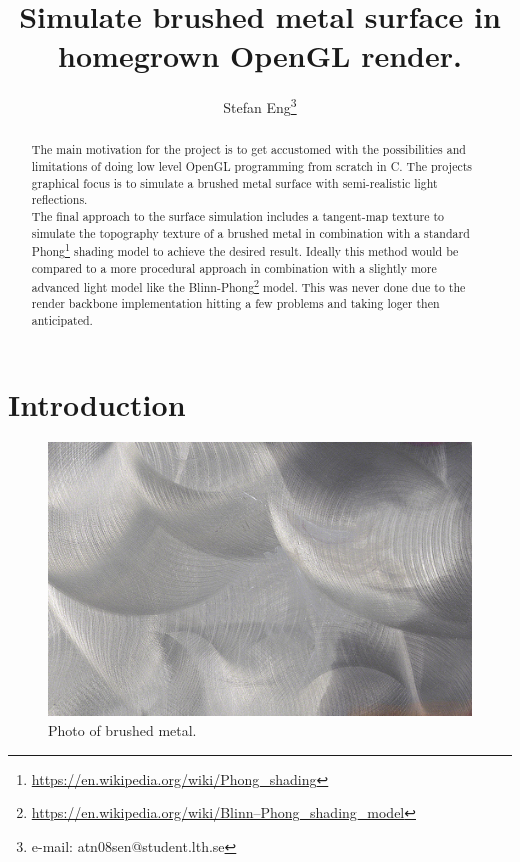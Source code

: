 \documentclass{acmsiggraph}               %
\title{Simulate brushed metal surface in homegrown OpenGL render.}
\author{Stefan Eng\thanks{e-mail: atn08sen@student.lth.se}
}
\affiliation{Lund University\\ Sweden}
\begin{document}
\ifpdf
\else
\fi


\maketitle

\begin{abstract}
The main motivation for the project is to get accustomed with the possibilities
and limitations of doing low level OpenGL programming from scratch in C. The projects
graphical focus is to simulate a brushed metal surface with semi-realistic light
reflections. \\

The final approach to the surface simulation includes a
tangent-map texture to simulate the topography texture of a brushed metal
in combination with a standard
Phong\footnote{\url{https://en.wikipedia.org/wiki/Phong_shading}} shading model to achieve the desired
result. Ideally this method would be compared to a more procedural approach in combination
with a slightly more advanced light model like the
Blinn-Phong\footnote{\url{https://en.wikipedia.org/wiki/Blinn–Phong_shading_model}} model. This was
never done due to the render backbone implementation hitting a few problems and
taking loger then anticipated.

\end{abstract}


\section{Introduction}

\begin{figure}[!ht]
    \centering
    \includegraphics[width=0.7\columnwidth]{brushed.jpg}
    \caption{Photo of brushed metal.}
    \label{brushed_real}
\end{figure}
\end{document}
